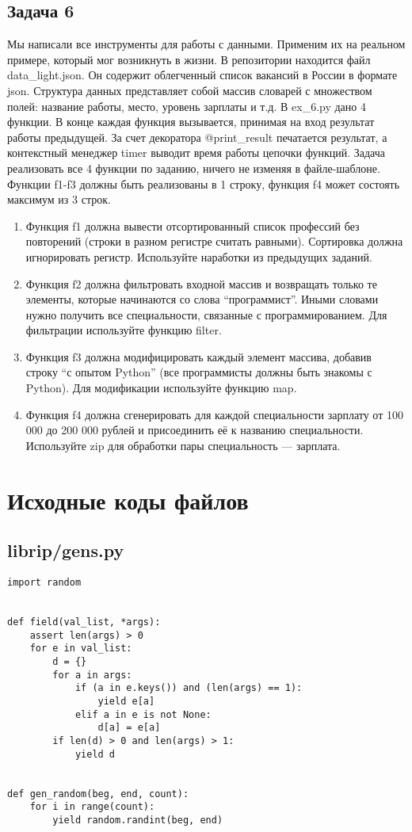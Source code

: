\documentclass{article}
\begin{document}
\subsection{Задача 6}
Мы написали все инструменты для работы с данными. Применим их на реальном примере, который мог возникнуть в жизни. В репозитории находится файл data\_light.json. Он содержит облегченный список вакансий в России в формате json.
Структура данных представляет собой массив словарей с множеством полей: название работы, место, уровень зарплаты и т.д.
В ex\_6.py дано 4 функции. В конце каждая функция вызывается, принимая на вход результат работы предыдущей. За счет декоратора @print\_result печатается результат, а контекстный менеджер timer выводит время работы цепочки функций.
Задача реализовать все 4 функции по заданию, ничего не изменяя в файле-шаблоне. Функции f1-f3 должны быть реализованы в 1 строку, функция f4 может состоять максимум из 3 строк.

\begin{enumerate}
    \item Функция f1 должна вывести отсортированный список профессий без повторений (строки в разном регистре считать равными). Сортировка должна игнорировать регистр. Используйте наработки из предыдущих заданий.
    \item Функция f2 должна фильтровать входной массив и возвращать только те элементы, которые начинаются со слова “программист”. Иными словами нужно получить все специальности, связанные с программированием. Для фильтрации используйте функцию filter.
    \item Функция f3 должна модифицировать каждый элемент массива, добавив строку “с опытом Python” (все программисты должны быть знакомы с Python). Для модификации используйте функцию map.
    \item Функция f4 должна сгенерировать для каждой специальности зарплату от 100 000 до 200 000 рублей и присоединить её к названию специальности. Используйте zip для обработки пары специальность — зарплата.
\end{enumerate}
\newpage
\section{Исходные коды файлов}
\subsection{librip/gens.py}
\begin{verbatim}
import random


def field(val_list, *args):
    assert len(args) > 0
    for e in val_list:
        d = {}
        for a in args:
            if (a in e.keys()) and (len(args) == 1):
                yield e[a]
            elif a in e is not None:
                d[a] = e[a]
        if len(d) > 0 and len(args) > 1:
            yield d


def gen_random(beg, end, count):
    for i in range(count):
        yield random.randint(beg, end)

\end{verbatim}
\end{document}
